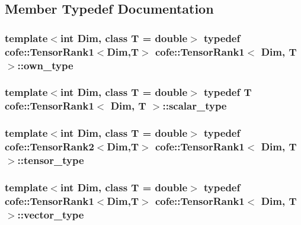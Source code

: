 \subsection{Member Typedef Documentation}
\hypertarget{classcofe_1_1TensorRank1_aa4dd23616b69d69a174a7d52083f0d0c}{
\subsubsection[{own\-\_\-type}]{\setlength{\rightskip}{0pt plus 5cm}template$<$int Dim, class T = double$>$ typedef {\bf cofe\-::\-Tensor\-Rank1}$<$Dim,T$>$ {\bf cofe\-::\-Tensor\-Rank1}$<$ Dim, T $>$\-::{\bf own\-\_\-type}}}\label{classcofe_1_1TensorRank1_aa4dd23616b69d69a174a7d52083f0d0c}
\hypertarget{classcofe_1_1TensorRank1_a10a89d234fbdb6695e1da39745f998c6}{
\subsubsection[{scalar\-\_\-type}]{\setlength{\rightskip}{0pt plus 5cm}template$<$int Dim, class T = double$>$ typedef T {\bf cofe\-::\-Tensor\-Rank1}$<$ Dim, T $>$\-::{\bf scalar\-\_\-type}}}\label{classcofe_1_1TensorRank1_a10a89d234fbdb6695e1da39745f998c6}
\hypertarget{classcofe_1_1TensorRank1_a1cca644cefcf4dafe9196b7a3017811c}{
\subsubsection[{tensor\-\_\-type}]{\setlength{\rightskip}{0pt plus 5cm}template$<$int Dim, class T = double$>$ typedef {\bf cofe\-::\-Tensor\-Rank2}$<$Dim,T$>$ {\bf cofe\-::\-Tensor\-Rank1}$<$ Dim, T $>$\-::{\bf tensor\-\_\-type}}}\label{classcofe_1_1TensorRank1_a1cca644cefcf4dafe9196b7a3017811c}
\hypertarget{classcofe_1_1TensorRank1_a3224169c2fe2e9df2d6206df73748e68}{
\subsubsection[{vector\-\_\-type}]{\setlength{\rightskip}{0pt plus 5cm}template$<$int Dim, class T = double$>$ typedef {\bf cofe\-::\-Tensor\-Rank1}$<$Dim,T$>$ {\bf cofe\-::\-Tensor\-Rank1}$<$ Dim, T $>$\-::{\bf vector\-\_\-type}}}\label{classcofe_1_1TensorRank1_a3224169c2fe2e9df2d6206df73748e68}


